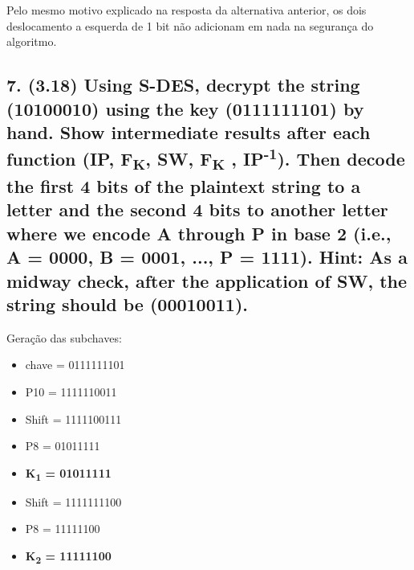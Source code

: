 \documentclass[12pt]{article}
\begin{document}
    Pelo mesmo motivo explicado na resposta da alternativa anterior, os dois
    deslocamento a esquerda de 1 bit não adicionam em nada na segurança do
    algoritmo.

\subsection*{7. (3.18) Using S-DES, decrypt the string (10100010) using the key
(0111111101) by hand. Show intermediate results after each function (IP,
F\textsubscript{K}, SW, F\textsubscript{K} , IP\textsuperscript{-1}). Then
decode the first 4 bits of the plaintext string to a letter and the second 4
bits to another letter where we encode A through P in base 2 (i.e., A = 0000, B
= 0001, ..., P = 1111). Hint: As a midway check, after the application of SW,
the string should be (00010011).}

  Geração das subchaves:
  \begin{itemize}
    \item chave = 0111111101
    \item P10 = 1111110011
    \item Shift = 1111100111
    \item P8 = 01011111
    \item \textbf{K\textsubscript{1} = 01011111}
    \item Shift = 1111111100
    \item P8 = 11111100
    \item \textbf{K\textsubscript{2} = 11111100}
  \end{itemize}
\end{document}
